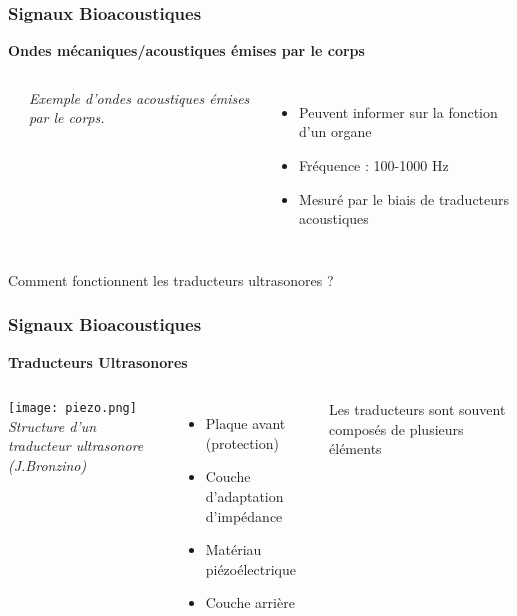 \documentclass{beamer}
\begin{document}
\begin{frame}
\frametitle{Signaux Bioacoustiques}
\textbf{Ondes mécaniques/acoustiques émises par le corps}
\begin{columns}
\column{60mm}
\begin{center}
\end{center}
\textit{Exemple d'ondes acoustiques émises par le corps.}
\column{60mm}
\begin{itemize}
\item Peuvent informer sur la fonction d'un organe
\vspace{0.2cm}
\item Fréquence : 100-1000 Hz 
\vspace{0.2cm}
\item Mesuré par le biais de traducteurs acoustiques
\end{itemize}
\end{columns}
\begin{block}{}
Comment fonctionnent les traducteurs ultrasonores ?
\end{block}
\end{frame}

\begin{frame}
\frametitle{Signaux Bioacoustiques}
\textbf{Traducteurs Ultrasonores}
\begin{columns}
\column{70mm}
\texttt{[image: piezo.png]}\\
\textit{\footnotesize{Structure d'un traducteur ultrasonore (J.Bronzino) }}
\column{50mm}
\begin{itemize}
\item Plaque avant (protection)
\vspace{0.2cm}
\item Couche d'adaptation d'impédance 
\vspace{0.2cm}
\item Matériau piézoélectrique
\vspace{0.2cm}
\item Couche arrière 
\end{itemize}
\vspace{0.4cm}
Les traducteurs sont souvent composés de plusieurs éléments
\end{columns}

\end{frame}
\end{document}
